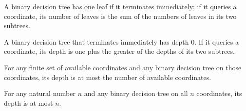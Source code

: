 \begin{definition}
\leanok
{}
A binary decision tree has one leaf if it terminates immediately; if it queries a
coordinate, its number of leaves is the sum of the numbers of leaves in its two
subtrees.
\end{definition}

\begin{definition}
\leanok
{}
A binary decision tree that terminates immediately has depth $0$. If it queries a
coordinate, its depth is one plus the greater of the depths of its two subtrees.
\end{definition}

\begin{theorem}
\leanok
{}
For any finite set of available coordinates and any binary decision tree on those
coordinates, its depth is at most the number of available coordinates.
\end{theorem}

\begin{theorem}
\leanok
{}
For any natural number $n$ and any binary decision tree on all $n$ coordinates, its
depth is at most $n$.
\end{theorem}

